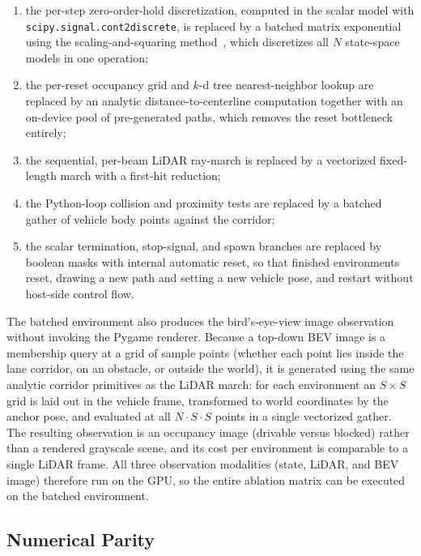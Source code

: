 \begin{enumerate}
    \item the per-step zero-order-hold discretization, computed in the scalar model with \texttt{scipy.signal.cont2discrete}, is replaced by a batched matrix exponential using the scaling-and-squaring method~\cite{higham2005scaling}, which discretizes all $N$ state-space models in one operation;
    \item the per-reset occupancy grid and $k$-d tree nearest-neighbor lookup are replaced by an analytic distance-to-centerline computation together with an on-device pool of pre-generated paths, which removes the reset bottleneck entirely;
    \item the sequential, per-beam LiDAR ray-march is replaced by a vectorized fixed-length march with a first-hit reduction;
    \item the Python-loop collision and proximity tests are replaced by a batched gather of vehicle body points against the corridor;
    \item the scalar termination, stop-signal, and spawn branches are replaced by boolean masks with internal automatic reset, so that finished environments reset, drawing a new path and setting a new vehicle pose, and restart without host-side control flow.
\end{enumerate}

The batched environment also produces the bird's-eye-view image observation without invoking the Pygame renderer. Because a top-down BEV image is a membership query at a grid of sample points (whether each point lies inside the lane corridor, on an obstacle, or outside the world), it is generated using the same analytic corridor primitives as the LiDAR march: for each environment an $S \times S$ grid is laid out in the vehicle frame, transformed to world coordinates by the anchor pose, and evaluated at all $N \cdot S \cdot S$ points in a single vectorized gather. The resulting observation is an occupancy image (drivable versus blocked) rather than a rendered grayscale scene, and its cost per environment is comparable to a single LiDAR frame. All three observation modalities (state, LiDAR, and BEV image) therefore run on the GPU, so the entire ablation matrix can be executed on the batched environment.

\subsection{Numerical Parity}

